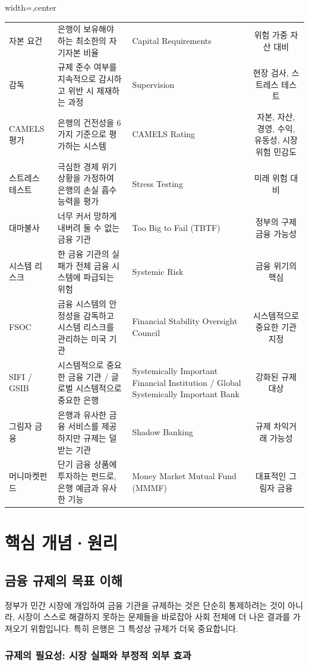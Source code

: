 \documentclass[11pt,a4paper]{book}
\theoremstyle{definition}
\begin{document}
\begin{adjustbox}{width=\textwidth,center}
\begin{tabular}{lllc}
자본 요건 & 은행이 보유해야 하는 최소한의 자기자본 비율 & Capital Requirements & 위험 가중 자산 대비 \\
감독 & 규제 준수 여부를 지속적으로 감시하고 위반 시 제재하는 과정 & Supervision & 현장 검사, 스트레스 테스트 \\
CAMELS 평가 & 은행의 건전성을 6가지 기준으로 평가하는 시스템 & CAMELS Rating & 자본, 자산, 경영, 수익, 유동성, 시장 위험 민감도 \\
스트레스 테스트 & 극심한 경제 위기 상황을 가정하여 은행의 손실 흡수 능력을 평가 & Stress Testing & 미래 위험 대비 \\
대마불사 & 너무 커서 망하게 내버려 둘 수 없는 금융 기관 & Too Big to Fail (TBTF) & 정부의 구제금융 가능성 \\
시스템 리스크 & 한 금융 기관의 실패가 전체 금융 시스템에 파급되는 위험 & Systemic Risk & 금융 위기의 핵심 \\
FSOC & 금융 시스템의 안정성을 감독하고 시스템 리스크를 관리하는 미국 기관 & Financial Stability Oversight Council & 시스템적으로 중요한 기관 지정 \\
SIFI / GSIB & 시스템적으로 중요한 금융 기관 / 글로벌 시스템적으로 중요한 은행 & Systemically Important Financial Institution / Global Systemically Important Bank & 강화된 규제 대상 \\
그림자 금융 & 은행과 유사한 금융 서비스를 제공하지만 규제는 덜 받는 기관 & Shadow Banking & 규제 차익거래 가능성 \\
머니마켓펀드 & 단기 금융 상품에 투자하는 펀드로, 은행 예금과 유사한 기능 & Money Market Mutual Fund (MMMF) & 대표적인 그림자 금융 \\
\bottomrule
\end{tabular}
\end{adjustbox}


\section{핵심 개념·원리}

\subsection{금융 규제의 목표 이해}

정부가 민간 시장에 개입하여 금융 기관을 규제하는 것은 단순히 통제하려는 것이 아니라, 시장이 스스로 해결하지 못하는 문제들을 바로잡아 사회 전체에 더 나은 결과를 가져오기 위함입니다. 특히 은행은 그 특성상 규제가 더욱 중요합니다.

\subsubsection{규제의 필요성: 시장 실패와 부정적 외부 효과}
\end{document}
